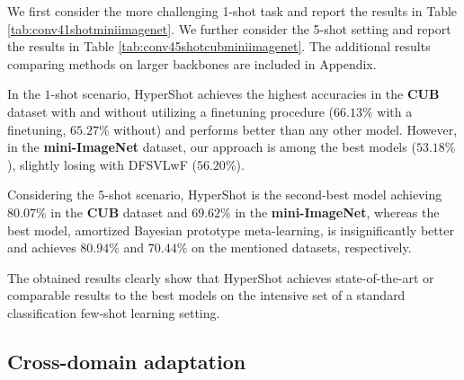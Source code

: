 \documentclass[nohyperref]{article}
\def\our{HyperShot}
\theoremstyle{plain}
\theoremstyle{definition}
\theoremstyle{remark}
\begin{document}
We first consider the more challenging 1-shot task and report the results in Table \ref{tab:conv41shotminiimagenet}. We further consider the 5-shot setting and report the results in Table \ref{tab:conv45shotcubminiimagenet}. The additional results comparing methods on larger backbones are included in Appendix.

In the $1$-shot scenario, \our{} achieves the highest accuracies in the \textbf{CUB} dataset with and without utilizing a finetuning procedure ($66.13\%$ with a finetuning, $65.27\%$ without) and performs better than any other model. However, in the \textbf{mini-ImageNet} dataset, our approach is among the best models ($53.18\%$), slightly losing with DFSVLwF \cite{gidaris2018dynamic} ($56.20\%$).

Considering the $5$-shot scenario, \our{} is the second-best model achieving $80.07\%$ in the \textbf{CUB} dataset and $69.62\%$ in the \textbf{mini-ImageNet}, whereas the best model, amortized Bayesian prototype meta-learning, is insignificantly better and achieves $80.94\%$ and $70.44\%$ on the mentioned datasets, respectively. 

The obtained results clearly show that \our{} achieves state-of-the-art or comparable results to the best models on the intensive set of a standard classification few-shot learning setting.




\subsection{Cross-domain adaptation}\label{sec:cross_domain}
\end{document}
